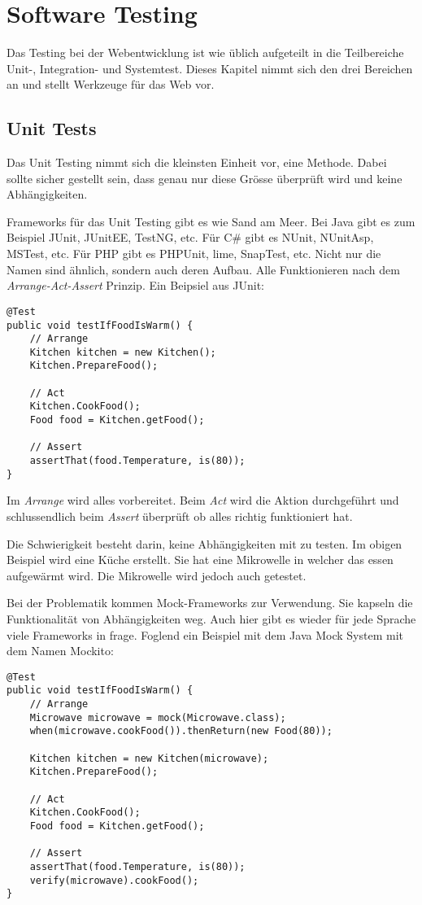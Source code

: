 \chapter{Software Testing}
Das Testing bei der Webentwicklung ist wie üblich aufgeteilt in die Teilbereiche Unit-, Integration- und Systemtest. Dieses Kapitel nimmt sich den drei Bereichen an und stellt Werkzeuge für das Web vor.

\section{Unit Tests}
Das Unit Testing nimmt sich die kleinsten Einheit vor, eine Methode. Dabei sollte sicher gestellt sein, dass genau nur diese Grösse überprüft wird und keine Abhängigkeiten.

Frameworks für das Unit Testing gibt es wie Sand am Meer. Bei Java gibt es zum Beispiel JUnit, JUnitEE, TestNG, etc. Für C\# gibt es NUnit, NUnitAsp, MSTest, etc. Für PHP gibt es PHPUnit, lime, SnapTest, etc. Nicht nur die Namen sind ähnlich, sondern auch deren Aufbau. Alle Funktionieren nach dem \textit{Arrange-Act-Assert} Prinzip. Ein Beipsiel aus JUnit:

\begin{lstlisting}
@Test
public void testIfFoodIsWarm() {
	// Arrange
	Kitchen kitchen = new Kitchen();
	Kitchen.PrepareFood();
	
	// Act
	Kitchen.CookFood();
	Food food = Kitchen.getFood();
	
	// Assert
	assertThat(food.Temperature, is(80));
}
\end{lstlisting}

Im \textit{Arrange} wird alles vorbereitet. Beim \textit{Act} wird die Aktion durchgeführt und schlussendlich beim \textit{Assert} überprüft ob alles richtig funktioniert hat.

Die Schwierigkeit besteht darin, keine Abhängigkeiten mit zu testen. Im obigen Beispiel wird eine Küche erstellt. Sie hat eine Mikrowelle in welcher das essen aufgewärmt wird. Die Mikrowelle wird jedoch auch getestet.

Bei der Problematik kommen Mock-Frameworks zur Verwendung. Sie kapseln die Funktionalität von Abhängigkeiten weg. Auch hier gibt es wieder für jede Sprache viele Frameworks in frage. Foglend ein Beispiel mit dem Java Mock System mit dem Namen Mockito:

\begin{lstlisting}
@Test
public void testIfFoodIsWarm() {
	// Arrange
	Microwave microwave = mock(Microwave.class);
	when(microwave.cookFood()).thenReturn(new Food(80));
	
	Kitchen kitchen = new Kitchen(microwave);
	Kitchen.PrepareFood();
	
	// Act
	Kitchen.CookFood();
	Food food = Kitchen.getFood();
	
	// Assert
	assertThat(food.Temperature, is(80));
	verify(microwave).cookFood();
}
\end{lstlisting}

